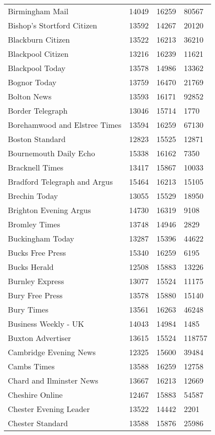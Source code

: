 \begin{longtable}{p{}p{}p{}p{}}
  Birmingham Mail & 14049 & 16259 & 80567 \\ 
  Bishop's Stortford Citizen & 13592 & 14267 & 20120 \\ 
  Blackburn Citizen & 13522 & 16213 & 36210 \\ 
  Blackpool Citizen & 13216 & 16239 & 11621 \\ 
  Blackpool Today & 13578 & 14986 & 13362 \\ 
  Bognor Today & 13759 & 16470 & 21769 \\ 
  Bolton News & 13593 & 16171 & 92852 \\ 
  Border Telegraph & 13046 & 15714 & 1770 \\ 
  Borehamwood and Elstree Times & 13594 & 16259 & 67130 \\ 
  Boston Standard & 12823 & 15525 & 12871 \\ 
  Bournemouth Daily Echo & 15338 & 16162 & 7350 \\ 
  Bracknell Times & 13417 & 15867 & 10033 \\ 
  Bradford Telegraph and Argus & 15464 & 16213 & 15105 \\ 
  Brechin Today & 13055 & 15529 & 18950 \\ 
  Brighton Evening Argus & 14730 & 16319 & 9108 \\ 
  Bromley Times & 13748 & 14946 & 2829 \\ 
  Buckingham Today & 13287 & 15396 & 44622 \\ 
  Bucks Free Press & 15340 & 16259 & 6195 \\ 
  Bucks Herald & 12508 & 15883 & 13226 \\ 
  Burnley Express & 13077 & 15524 & 11175 \\ 
  Bury Free Press & 13578 & 15880 & 15140 \\ 
  Bury Times & 13561 & 16263 & 46248 \\ 
  Business Weekly - UK & 14043 & 14984 & 1485 \\ 
  Buxton Advertiser & 13615 & 15524 & 118757 \\ 
  Cambridge Evening News & 12325 & 15600 & 39484 \\ 
  Cambs Times & 13588 & 16259 & 12758 \\ 
  Chard and Ilminster News & 13667 & 16213 & 12669 \\ 
  Cheshire Online & 12467 & 15883 & 54587 \\ 
  Chester Evening Leader & 13522 & 14442 & 2201 \\ 
  Chester Standard & 13588 & 15876 & 25986 \\ 

\end{longtable}
